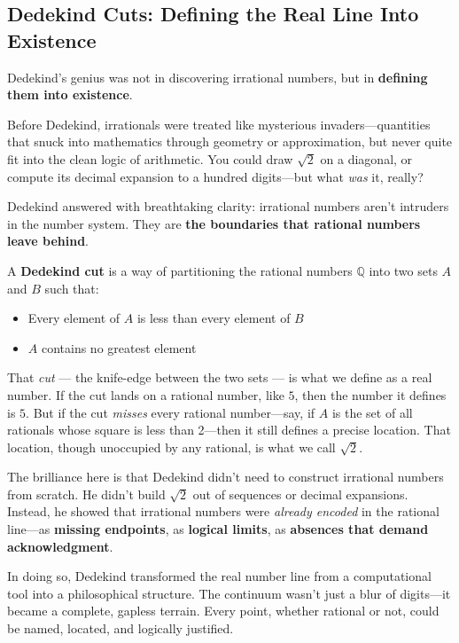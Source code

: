 \subsection{Dedekind Cuts: Defining the Real Line Into Existence}

Dedekind’s genius was not in discovering irrational numbers, but in \textbf{defining them into existence}.

Before Dedekind, irrationals were treated like mysterious invaders—quantities that snuck into mathematics through geometry or approximation, but never quite fit into the clean logic of arithmetic. You could draw \( \sqrt{2} \) on a diagonal, or compute its decimal expansion to a hundred digits—but what \emph{was} it, really?

Dedekind answered with breathtaking clarity: irrational numbers aren’t intruders in the number system. They are \textbf{the boundaries that rational numbers leave behind}.

\medskip

A \textbf{Dedekind cut} is a way of partitioning the rational numbers \( \mathbb{Q} \) into two sets \( A \) and \( B \) such that:

\begin{itemize}
  \item Every element of \( A \) is less than every element of \( B \)
  \item \( A \) contains no greatest element
\end{itemize}

That \emph{cut} — the knife-edge between the two sets — is what we define as a real number. If the cut lands on a rational number, like \( 5 \), then the number it defines is \( 5 \). But if the cut \emph{misses} every rational number—say, if \( A \) is the set of all rationals whose square is less than 2—then it still defines a precise location. That location, though unoccupied by any rational, is what we call \( \sqrt{2} \).

\medskip

The brilliance here is that Dedekind didn’t need to construct irrational numbers from scratch. He didn’t build \( \sqrt{2} \) out of sequences or decimal expansions. Instead, he showed that irrational numbers were \emph{already encoded} in the rational line—as \textbf{missing endpoints}, as \textbf{logical limits}, as \textbf{absences that demand acknowledgment}.

In doing so, Dedekind transformed the real number line from a computational tool into a philosophical structure. The continuum wasn’t just a blur of digits—it became a complete, gapless terrain. Every point, whether rational or not, could be named, located, and logically justified.

